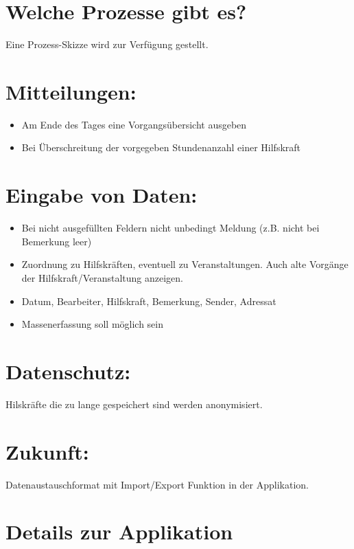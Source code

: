 \documentclass[a4paper]{scrartcl}
\begin{document}
        
    \section*{Welche Prozesse gibt es?}
        Eine Prozess-Skizze wird zur Verfügung gestellt.
        
    \section*{Mitteilungen:}
        \begin{itemize}
            \item Am Ende des Tages eine Vorgangsübersicht ausgeben
            \item Bei Überschreitung der vorgegeben Stundenanzahl einer Hilfskraft
        \end{itemize}

    \section*{Eingabe von Daten:}
        \begin{itemize}
            \item Bei nicht ausgefüllten Feldern nicht unbedingt Meldung (z.B. nicht bei Bemerkung leer)
            \item Zuordnung zu Hilfskräften, eventuell zu Veranstaltungen. Auch alte Vorgänge der Hilfskraft/Veranstaltung anzeigen.
            \item Datum, Bearbeiter, Hilfskraft, Bemerkung, Sender, Adressat
            \item Massenerfassung soll möglich sein
        \end{itemize}
    
    \section*{Datenschutz:}
        Hilskräfte die zu lange gespeichert sind werden anonymisiert.
        
    \section*{Zukunft:}
        Datenaustauschformat mit Import/Export Funktion in der Applikation.
    
    \section*{Details zur Applikation}
    
\end{document}

